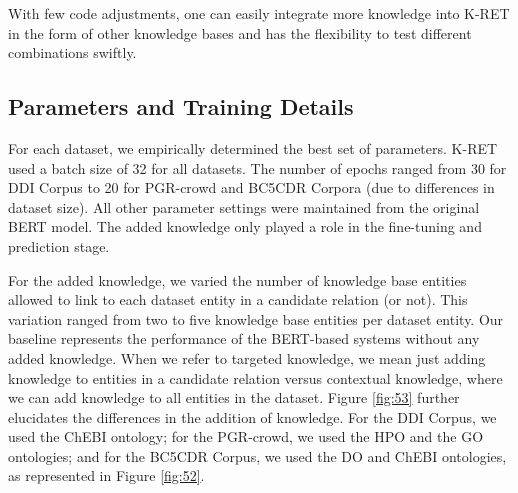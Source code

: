With few code adjustments, one can easily integrate more knowledge into K-RET in the form of other knowledge bases and has the flexibility to test different combinations swiftly.  


\subsection{Parameters and Training Details}

For each dataset, we empirically determined the best set of parameters. K-RET used a batch size of 32 for all datasets. The number of epochs ranged from 30 for DDI Corpus to 20 for PGR-crowd and BC5CDR Corpora (due to differences in dataset size). All other parameter settings were maintained from the original BERT model. The added knowledge only played a role in the fine-tuning and prediction stage.  

For the added knowledge, we varied the number of knowledge base entities allowed to link to each dataset entity in a candidate relation (or not). This variation ranged from two to five knowledge base entities per dataset entity. Our baseline represents the performance of the BERT-based systems without any added knowledge. When we refer to targeted knowledge, we mean just adding knowledge to entities in a candidate relation versus contextual knowledge, where we can add knowledge to all entities in the dataset. Figure \ref{fig:53} further elucidates the differences in the addition of knowledge. For the DDI Corpus, we used the ChEBI ontology; for the PGR-crowd, we used the HPO and the GO ontologies; and for the BC5CDR Corpus, we used the DO and ChEBI ontologies, as represented in Figure \ref{fig:52}.

